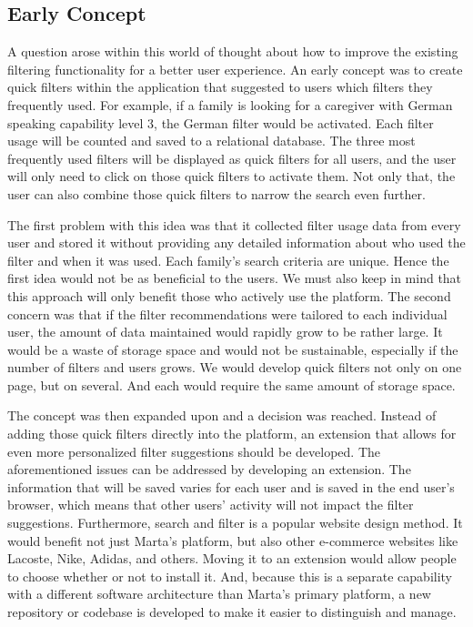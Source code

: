 \subsection{Early Concept}
A question arose within this world of thought about how to improve the existing filtering functionality for a better user experience. An early concept was to create quick filters within the application that suggested to users which filters they frequently used. For example, if a family is looking for a caregiver with German speaking capability level 3, the German filter would be activated. Each filter usage will be counted and saved to a relational database. The three most frequently used filters will be displayed as quick filters for all users, and the user will only need to click on those quick filters to activate them. Not only that, the user can also combine those quick filters to narrow the search even further.

The first problem with this idea was that it collected filter usage data from every user and stored it without providing any detailed information about who used the filter and when it was used. Each family's search criteria are unique. Hence the first idea would not be as beneficial to the users. We must also keep in mind that this approach will only benefit those who actively use the platform. The second concern was that if the filter recommendations were tailored to each individual user, the amount of data maintained would rapidly grow to be rather large. It would be a waste of storage space and would not be sustainable, especially if the number of filters and users grows. We would develop quick filters not only on one page, but on several. And each would require the same amount of storage space.

The concept was then expanded upon and a decision was reached. Instead of adding those quick filters directly into the platform, an extension that allows for even more personalized filter suggestions should be developed. The aforementioned issues can be addressed by developing an extension. The information that will be saved varies for each user and is saved in the end user's browser, which means that other users' activity will not impact the filter suggestions. Furthermore, search and filter is a popular website design method. It would benefit not just Marta's platform, but also other e-commerce websites like Lacoste, Nike, Adidas, and others. Moving it to an extension would allow people to choose whether or not to install it. And, because this is a separate capability with a different software architecture than Marta's primary platform, a new repository or codebase is developed to make it easier to distinguish and manage.

